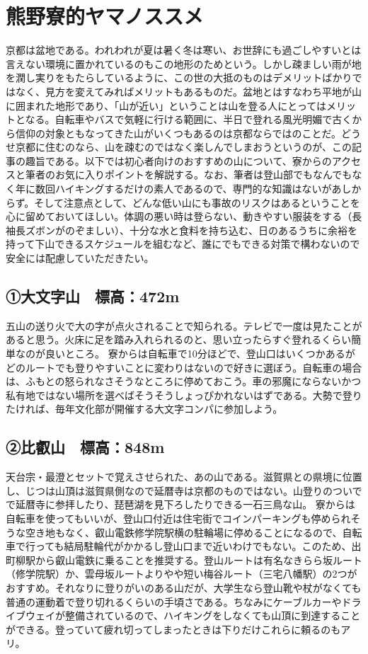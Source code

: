 \section{ 熊野寮的ヤマノススメ}


京都は盆地である。われわれが夏は暑く冬は寒い、お世辞にも過ごしやすいとは言えない環境に置かれているのもこの地形のためという。しかし疎ましい雨が地を潤し実りをもたらしているように、この世の大抵のものはデメリットばかりではなく、見方を変えてみればメリットもあるものだ。盆地とはすなわち平地が山に囲まれた地形であり、「山が近い」ということは山を登る人にとってはメリットとなる。自転車やバスで気軽に行ける範囲に、半日で登れる風光明媚で古くから信仰の対象ともなってきた山がいくつもあるのは京都ならではのことだ。どうせ京都に住むのなら、山を疎むのではなく楽しんでしまおうというのが、この記事の趣旨である。以下では初心者向けのおすすめの山について、寮からのアクセスと筆者のお気に入りポイントを解説する。なお、筆者は登山部でもなんでもなく年に数回ハイキングするだけの素人であるので、専門的な知識はないがあしからず。そして注意点として、どんな低い山にも事故のリスクはあるということを心に留めておいてほしい。体調の悪い時は登らない、動きやすい服装をする（長袖長ズボンがのぞましい）、十分な水と食料を持ち込む、日のあるうちに余裕を持って下山できるスケジュールを組むなど、誰にでもできる対策で構わないので安全には配慮していただきたい。

\subsection{①大文字山　標高：472m}
五山の送り火で大の字が点火されることで知られる。テレビで一度は見たことがあると思う。火床に足を踏み入れられるのと、思い立ったらすぐ登れるくらい簡単なのが良いところ。
寮からは自転車で10分ほどで、登山口はいくつかあるがどのルートでも登りやすいことに変わりはないので好きに選ぼう。自転車の場合は、ふもとの怒られなさそうなところに停めておこう。車の邪魔にならないかつ私有地ではない場所を選べばそうそうしょっぴかれないはずである。大勢で登りたければ、毎年文化部が開催する大文字コンパに参加しよう。
\subsection{②比叡山　標高：848m}
天台宗・最澄とセットで覚えさせられた、あの山である。滋賀県との県境に位置し、じつは山頂は滋賀県側なので延暦寺は京都のものではない。山登りのついでで延暦寺に参拝したり、琵琶湖を見下ろしたりできる一石三鳥な山。
寮からは自転車を使ってもいいが、登山口付近は住宅街でコインパーキングも停められそうな空き地もなく、叡山電鉄修学院駅横の駐輪場に停めることになるので、自転車で行っても結局駐輪代がかかるし登山口まで近いわけでもない。このため、出町柳駅から叡山電鉄に乗ることを推奨する。登山ルートは有名なきらら坂ルート（修学院駅）か、雲母坂ルートよりやや短い梅谷ルート（三宅八幡駅）の2つがおすすめ。それなりに登りがいのある山だが、大学生なら登山靴や杖がなくても普通の運動着で登り切れるくらいの手頃さである。ちなみにケーブルカーやドライブウェイが整備されているので、ハイキングをしなくても山頂に到達することができる。登っていて疲れ切ってしまったときは下りだけこれらに頼るのもアリ。
